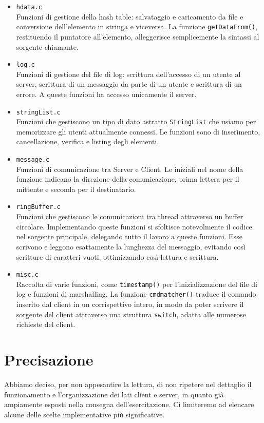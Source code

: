 \documentclass[a4paper, 11pt]{article} %
\begin{document}
\begin{itemize}
	\item \texttt{hdata.c}\\
	Funzioni di gestione della hash table: salvataggio e caricamento da file e conversione dell'elemento in stringa e viceversa. La funzione \texttt{getDataFrom()}, restituendo il puntatore all'elemento, alleggerisce semplicemente la sintassi al sorgente chiamante.
	\item  \texttt{log.c}\\
	Funzioni di gestione del file di log: scrittura dell'accesso di un utente al server, scrittura di un messaggio da parte di un utente e scrittura di un errore. A queste funzioni ha accesso unicamente il server.
	\item  \texttt{stringList.c}\\
	Funzioni che gestiscono un tipo di dato astratto \texttt{StringList} che usiamo per memorizzare gli utenti attualmente connessi. Le funzioni sono di inserimento, cancellazione, verifica e listing degli elementi.
	\item  \texttt{message.c}\\
	Funzioni di comunicazione tra Server e Client. Le iniziali nel nome della funzione indicano la direzione della comunicazione, prima lettera per il mittente e seconda per il destinatario.
	\item  \texttt{ringBuffer.c}\\
	Funzioni che gestiscono le comunicazioni tra thread attraverso un buffer circolare. Implementando queste funzioni si sfoltisce notevolmente il codice nel sorgente principale, delegando tutto il lavoro a queste funzioni. Esse scrivono e leggono esattamente la lunghezza del messaggio, evitando così scritture di caratteri vuoti, ottimizzando così lettura e scrittura. 
	\item  \texttt{misc.c}\\
	Raccolta di varie funzioni, come \texttt{timestamp()} per l'inizializzazione del file di log e funzioni di marshalling. La funzione \texttt{cmdmatcher()} traduce il comando inserito dal client in un corrispettivo intero, in modo da poter scrivere il sorgente del client attraverso una struttura \texttt{switch}, adatta alle numerose richieste del client.
\end{itemize}
\section*{Precisazione}
Abbiamo deciso, per non appesantire la lettura, di non ripetere nel dettaglio il funzionamento e l'organizzazione dei lati client e server, in quanto già ampiamente esposti nella consegna dell'esercitazione. Ci limiteremo ad elencare alcune delle scelte implementative più significative.
\end{document}
